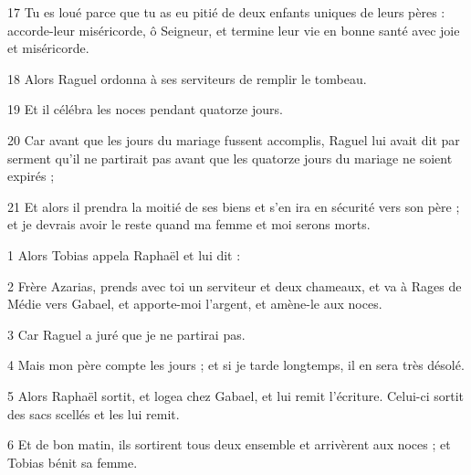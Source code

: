 \par 17 Tu es loué parce que tu as eu pitié de deux enfants uniques de leurs pères : accorde-leur miséricorde, ô Seigneur, et termine leur vie en bonne santé avec joie et miséricorde.
\par 18 Alors Raguel ordonna à ses serviteurs de remplir le tombeau.
\par 19 Et il célébra les noces pendant quatorze jours.
\par 20 Car avant que les jours du mariage fussent accomplis, Raguel lui avait dit par serment qu'il ne partirait pas avant que les quatorze jours du mariage ne soient expirés ;
\par 21 Et alors il prendra la moitié de ses biens et s'en ira en sécurité vers son père ; et je devrais avoir le reste quand ma femme et moi serons morts.


\par 1 Alors Tobias appela Raphaël et lui dit :
\par 2 Frère Azarias, prends avec toi un serviteur et deux chameaux, et va à Rages de Médie vers Gabael, et apporte-moi l'argent, et amène-le aux noces.
\par 3 Car Raguel a juré que je ne partirai pas.
\par 4 Mais mon père compte les jours ; et si je tarde longtemps, il en sera très désolé.
\par 5 Alors Raphaël sortit, et logea chez Gabael, et lui remit l'écriture. Celui-ci sortit des sacs scellés et les lui remit.
\par 6 Et de bon matin, ils sortirent tous deux ensemble et arrivèrent aux noces ; et Tobias bénit sa femme.


